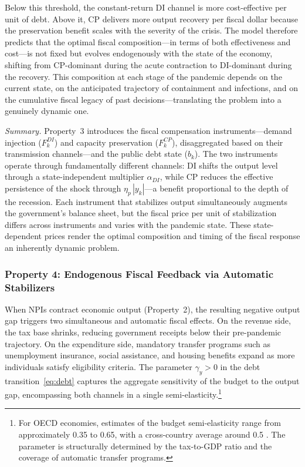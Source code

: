 \documentclass[12pt, a4paper]{article}
\begin{document}
Below this threshold, the constant-return DI channel is more cost-effective per unit of debt. Above it, CP delivers more output recovery per fiscal dollar because the preservation benefit scales with the severity of the crisis. The model therefore predicts that the optimal fiscal composition---in terms of both effectiveness and cost---is not fixed but evolves endogenously with the state of the economy, shifting from CP-dominant during the acute contraction to DI-dominant during the recovery. This composition at each stage of the pandemic depends on the current state, on the anticipated trajectory of containment and infections, and on the cumulative fiscal legacy of past decisions---translating the problem into a genuinely dynamic one.


\vspace{5mm}
\noindent\textit{Summary.} Property~3 introduces the fiscal compensation instruments---demand injection ($F^{DI}_k$) and capacity preservation ($F^{CP}_k$), disaggregated based on their transmission channels---and the public debt state ($b_k$). The two instruments operate through fundamentally different channels: DI shifts the output level through a state-independent multiplier $\alpha_{DI}$, while CP reduces the effective persistence of the shock through $\eta_p\, |y_k|$---a benefit proportional to the depth of the recession. Each instrument that stabilizes output simultaneously augments the government's balance sheet, but the fiscal price per unit of stabilization differs across instruments and varies with the pandemic state. These state-dependent prices render the optimal composition and timing of the fiscal response an inherently dynamic problem.


\subsubsection*{Property 4: Endogenous Fiscal Feedback via Automatic Stabilizers}

When NPIs contract economic output (Property~2), the resulting negative output gap triggers two simultaneous and automatic fiscal effects. On the revenue side, the tax base shrinks, reducing government receipts below their pre-pandemic trajectory. On the expenditure side, mandatory transfer programs such as unemployment insurance, social assistance, and housing benefits expand as more individuals satisfy eligibility criteria. The parameter $\gamma_y > 0$ in the debt transition~\eqref{eq:debt} captures the aggregate sensitivity of the budget to the output gap, encompassing both channels in a single semi-elasticity.\footnote{For OECD economies, estimates of the budget semi-elasticity range from approximately 0.35 to 0.65, with a cross-country average around 0.5 \citep{repec:oecd}. The parameter is structurally determined by the tax-to-GDP ratio and the coverage of automatic transfer programs.}
\end{document}
